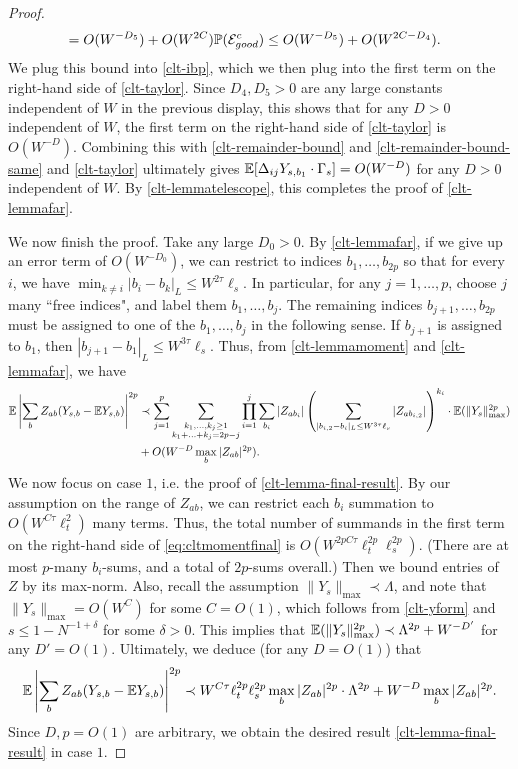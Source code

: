 \begin{proof}
\begin{align}
&=O(W^{-D_{5}})+O(W^{2C})\mathbb{P}({\cal E}_{good}^{c})\leq O(W^{-D_{5}})+O(W^{2C-D_{4}}).
\end{align}
%
We plug this bound into \eqref{clt-ibp}, which we then plug into the first term on the right-hand side of \eqref{clt-taylor}. Since $D_{4},D_{5}>0$ are any large constants independent of $W$ in the previous display, this shows that for any $D>0$ independent of $W$, the first term on the right-hand side of \eqref{clt-taylor} is $O(W^{-D})$. Combining this with \eqref{clt-remainder-bound} and \eqref{clt-remainder-bound-same} and \eqref{clt-taylor} ultimately gives $\mathbb{E}[\Delta_{ij}Y_{s,b_{1}}\cdot\Gamma_{s}]=O(W^{-D})$ for any $D>0$ independent of $W$. By \eqref{clt-lemmatelescope}, this completes the proof of \eqref{clt-lemmafar}.

{We now finish the proof. Take any large $D_{0}>0$. By \eqref{clt-lemmafar}, if we give up an error term of $O(W^{-D_{0}})$, we can restrict to indices $b_{1},\ldots,b_{2p}$ so that for every $i$, we have $\min_{k\neq i}|b_{i}-b_{k}|_{L}\leq W^{2\tau}\ell_{s}$. In particular, for any $j=1,\ldots,p$, choose $j$ many ``free indices", and label them $b_{1},\ldots,b_{j}$. The remaining indices $b_{j+1},\ldots,b_{2p}$ must be assigned to one of the $b_{1},\ldots,b_{j}$ in the following sense. If $b_{j+1}$ is assigned to $b_{1}$, then $|b_{j+1}-b_{1}|_{L}\leq W^{3\tau}\ell_{s}$. Thus, from \eqref{clt-lemmamoment} and \eqref{clt-lemmafar}, we have
%
\begin{align}
\mathbb{E}\left|\sum_{b}Z_{ab}(Y_{s,b}-\mathbb{E} Y_{s,b})\right|^{2p}&\prec\sum_{j=1}^{p}\sum_{\substack{k_{1},\ldots,k_{j}\geq1\\k_{1}+\ldots+k_{j}=2p-j}}\prod_{i=1}^{j}\sum_{b_{i}}|Z_{ab_{i}}|\left(\sum_{|b_{i,2}-b_{i}|_{L}\leq W^{3\tau}\ell_{s}}|Z_{ab_{i,2}}|\right)^{k_{i}}\cdot \mathbb{E}(\|Y_{s}\|_{\max}^{2p})\label{eq:cltmomentfinal}\\
&+O(W^{-D}\max_{b}|Z_{ab}|^{2p}).\nonumber
\end{align}
%
We now focus on case $1$, i.e. the proof of \eqref{clt-lemma-final-result}. By our assumption on the range of $Z_{ab}$, we can restrict each $b_{i}$ summation to $O(W^{C\tau}\ell_{t}^{2})$ many terms. Thus, the total number of summands in the first term on the right-hand side of \eqref{eq:cltmomentfinal} is $O(W^{2pC\tau}\ell_{t}^{2p}\ell_{s}^{2p})$. (There are at most $p$-many $b_{i}$-sums, and a total of $2p$-sums overall.) Then we bound entries of $Z$ by its max-norm. Also, recall the assumption $\|Y_{s}\|_{\max}\prec\Lambda$, and note that $\|Y_{s}\|_{\max}=O(W^{C})$ for some $C=O(1)$, which follows from \eqref{clt-yform} and $s\leq 1-N^{-1+\delta}$ for some $\delta>0$. This implies that $\mathbb{E}(\|Y_{s}\|_{\max}^{2p})\prec\Lambda^{2p} +W^{-D'}$ for any $D'=O(1)$. Ultimately, we deduce (for any $D=O(1)$) that
%
\begin{align*}
\mathbb{E}\left|\sum_{b}Z_{ab}(Y_{s,b}-\mathbb{E} Y_{s,b})\right|^{2p} \prec W^{C\tau}\ell_{t}^{2p}\ell_{s}^{2p}\max_{b}|Z_{ab}|^{2p}\cdot\Lambda^{2p}+W^{-D}\max_{b}|Z_{ab}|^{2p}.
\end{align*}
%
Since $D,p=O(1)$ are arbitrary, we obtain the desired result \eqref{clt-lemma-final-result} in case $1$.

}
\end{proof}
